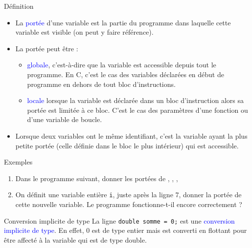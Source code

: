 \documentclass[10pt]{beamer}
\begin{document}
\begin{frame}{\Ctitle}{\stitle}
	\begin{alertblock}{Définition}
		\begin{itemize}
			\item<1-> La \textcolor{blue}{portée} d'une variable est la partie du programme  dans laquelle cette variable est visible (on peut y faire référence).
			\item<2-> La portée peut être :
				\begin{itemize}
					\item<3-> \textcolor{blue}{globale}, c'est-à-dire que la variable est accessible depuis tout le programme. En C, c'est le cas des variables déclarées en début de programme en dehors de tout bloc d'instructions.
					\item<4-> \textcolor{blue}{locale} lorsque la variable est déclarée dans un bloc d'instruction alors sa portée est limitée à ce bloc. C'est le cas des paramètres d'une fonction ou d'une variable de boucle.
				\end{itemize}
			\item<5-> Lorsque deux variables ont le même identifiant, c'est la variable ayant la plus petite portée (celle définie dans le bloc le plus intérieur) qui est accessible.
		\end{itemize}
	\end{alertblock}
\end{frame}

\begin{frame}[fragile]{\Ctitle}{\stitle}
	\begin{exampleblock}{Exemples}
		\begin{enumerate}
		\item<1->{\small Dans le programme suivant, donner les portées de , , , }
		\item<2->{\small On définit une variable entière {\tt i}, juste après la ligne 7, donner la portée de cette nouvelle variable. Le programme fonctionne-t-il encore correctement ?}
		\end{enumerate}
	\end{exampleblock}
\end{frame}


\begin{frame}[fragile]{\Ctitle}{\stitle}

	\begin{block}{Conversion implicite de type}
		La ligne \texttt{double somme = 0;} est une \textcolor{blue}{conversion implicite de type}. En effet, 0 est de type entier mais est converti en flottant pour être affecté à la variable  qui est de type double.
	\end{block}
\end{frame}
\end{document}
